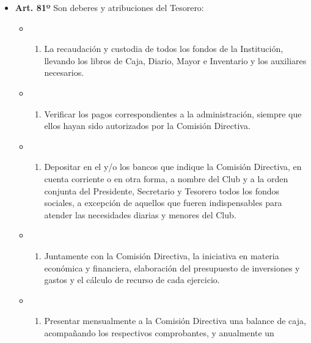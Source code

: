 \documentclass[]{book}
\providecommand{\tightlist}{%
  \setlength{\itemsep}{0pt}\setlength{\parskip}{0pt}}
\begin{document}
\begin{itemize}
\tightlist
\item
  \textbf{Art. 81º} Son deberes y atribuciones del Tesorero:

  \begin{itemize}
  \item
    \begin{enumerate}
    \def\labelenumi{\alph{enumi})}
    \tightlist
    \item
      La recaudación y custodia de todos los fondos de la Institución,
      llevando los libros de Caja, Diario, Mayor e Inventario y los
      auxiliares necesarios.
    \end{enumerate}
  \item
    \begin{enumerate}
    \def\labelenumi{\alph{enumi})}
    \setcounter{enumi}{1}
    \tightlist
    \item
      Verificar los pagos correspondientes a la administración, siempre
      que ellos hayan sido autorizados por la Comisión Directiva.
    \end{enumerate}
  \item
    \begin{enumerate}
    \def\labelenumi{\alph{enumi})}
    \setcounter{enumi}{2}
    \tightlist
    \item
      Depositar en el y/o los bancos que indique la Comisión Directiva,
      en cuenta corriente o en otra forma, a nombre del Club y a la
      orden conjunta del Presidente, Secretario y Tesorero todos los
      fondos sociales, a excepción de aquellos que fueren indispensables
      para atender las necesidades diarias y menores del Club.
    \end{enumerate}
  \item
    \begin{enumerate}
    \def\labelenumi{\alph{enumi})}
    \setcounter{enumi}{3}
    \tightlist
    \item
      Juntamente con la Comisión Directiva, la iniciativa en materia
      económica y financiera, elaboración del presupuesto de inversiones
      y gastos y el cálculo de recurso de cada ejercicio.
    \end{enumerate}
  \item
    \begin{enumerate}
    \def\labelenumi{\alph{enumi})}
    \setcounter{enumi}{4}
    \tightlist
    \item
      Presentar mensualmente a la Comisión Directiva una balance de
      caja, acompañando los respectivos comprobantes, y anualmente un

\end{enumerate}
\end{itemize}
\end{itemize}
\end{document}
